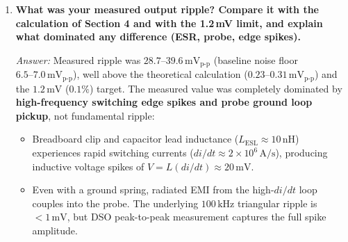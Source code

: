 \documentclass[12pt,a4paper]{article}
\newcommand{\Vin}{V_{\mathrm{IN}}}
\newcommand{\DCR}{R_{L,\mathrm{dcr}}}
\begin{document}
\begin{enumerate}[leftmargin=1.8em, label=\textbf{Q\arabic*.}, itemsep=1.0em]
    \emph{Answer:}
    \begin{itemize}[itemsep=2pt, topsep=2pt]
        \item \textbf{Line Regulation:} Measured at \textbf{$3.50\,\mathrm{mV/V}$} ($0.297\%/\mathrm{V}$), compared to $1.20\,\mathrm{mV/V}$ for the linear regulator of Exp 8. In Exp 8, line regulation is limited by the op-amp open-loop gain ($A_{OL}$). In the buck regulator, the PWM modulator gain is line-dependent ($K_{\mathrm{PWM}} = \Vin / V_{\mathrm{ramp}}$), so a line step instantly perturbs the loop, requiring the slow integrator ($f_c \approx 20\,\mathrm{Hz}$) tens of milliseconds to correct.
        \item \textbf{Load Regulation:} Measured at \textbf{$61.7\,\mathrm{mV/A}$} at $3\,\mathrm{V}$ and \textbf{$123.5\,\mathrm{mV/A}$} at $5\,\mathrm{V}$, compared to $42.0\,\mathrm{mV/A}$ for Exp 8. In the buck regulator, load regulation is limited by inductor $\DCR$ ($0.8\,\Omega$), breadboard trace/contact resistances, and finite integrator bandwidth.
    \end{itemize}

    \item \textbf{What was your measured output ripple? Compare it with the calculation of Section 4 and with the 1.2\,mV limit, and explain what dominated any difference (ESR, probe, edge spikes).}
    
    \emph{Answer:}
    Measured ripple was $28.7\text{--}39.6\,\mathrm{mV}_{\mathrm{p\text{-}p}}$ (baseline noise floor $6.5\text{--}7.0\,\mathrm{mV}_{\mathrm{p\text{-}p}}$), well above the theoretical calculation ($0.23\text{--}0.31\,\mathrm{mV}_{\mathrm{p\text{-}p}}$) and the $1.2\,\mathrm{mV}$ ($0.1\%$) target. The measured value was completely dominated by \textbf{high-frequency switching edge spikes and probe ground loop pickup}, not fundamental ripple:
    \begin{itemize}[itemsep=2pt, topsep=2pt]
        \item Breadboard clip and capacitor lead inductance ($L_{\mathrm{ESL}} \approx 10\,\mathrm{nH}$) experiences rapid switching currents ($di/dt \approx 2\times 10^6\,\mathrm{A/s}$), producing inductive voltage spikes of $V = L(di/dt) \approx 20\,\mathrm{mV}$.
        \item Even with a ground spring, radiated EMI from the high-$di/dt$ loop couples into the probe. The underlying $100\,\mathrm{kHz}$ triangular ripple is $< 1\,\mathrm{mV}$, but DSO peak-to-peak measurement captures the full spike amplitude.
    \end{itemize}


\end{enumerate}
\end{document}

